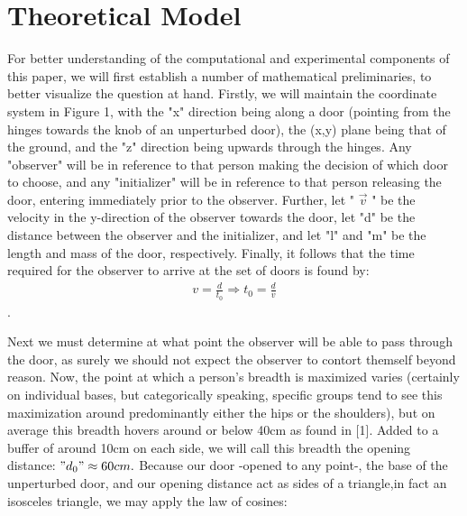 \section{Theoretical Model} \label{sec:Theoretical Model}
    For better understanding of the computational and experimental components of this paper, we will first establish a number of mathematical preliminaries, to better visualize the question at hand. Firstly, we will maintain the coordinate system in Figure 1, with the "x" direction being along a door (pointing from the hinges towards the knob of an unperturbed door), the (x,y) plane being that of the ground, and the "z" direction being upwards through the hinges. Any "observer" will be in reference to that person making the decision of which door to choose, and any "initializer" will be in reference to that person releasing the door, entering immediately prior to the observer. Further, let " $\vec{v}$ " be the velocity in the y-direction of the observer towards the door, let "d" be the distance between the observer and the initializer, and let "l" and "m" be the length and mass of the door, respectively. Finally, it follows that the time required for the observer to arrive at the set of doors is found by:
    \begin{eqnarray}
        v=\frac{d}{t_{0}}\Rightarrow{}t_{0}=\frac{d}{v}
    \end{eqnarray}.
    \par
    Next we must determine at what point the observer will be able to pass through the door, as surely we should not expect the observer to contort themself beyond reason. Now, the point at which a person's breadth is maximized varies (certainly on individual bases, but categorically speaking, specific groups tend to see this maximization around predominantly either the hips or the shoulders), but on average this breadth hovers around or below 40cm as found in [1]. Added to a buffer of around 10cm on each side, we will call this breadth the opening distance: $"d_{0}"\approx60cm.$ Because our door -opened to any point-, the base of the unperturbed door, and our opening distance act as sides of a triangle,in fact an isosceles triangle, we may apply the law of cosines:
    
